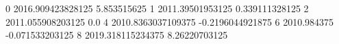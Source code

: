 0 2016.909423828125 5.853515625
1 2011.39501953125 0.339111328125
2 2011.055908203125 0.0
4 2010.8363037109375 -0.2196044921875
6 2010.984375 -0.071533203125
8 2019.318115234375 8.26220703125
